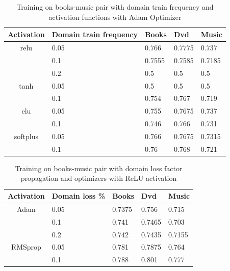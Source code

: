 \documentclass[11pt,a4paper]{article}
\begin{document}
\begin{table}[h]
\begin{center}
\begin{tabular}{|c|l|l|l|l|}
\hline
Activation & \multicolumn{1}{|p{1cm}|}{Domain train frequency}& Books & Dvd & Music \\
\hline
relu & 0.05 & 0.766 & 0.7775 & 0.737 \\
  & 0.1 & 0.7555 & 0.7585 & 0.7185 \\
  & 0.2 & 0.5 & 0.5 & 0.5 \\
\hline
tanh & 0.05 & 0.5 & 0.5 & 0.5  \\
  & 0.1 & 0.754 & 0.767 & 0.719 \\
\hline
elu & 0.05 & 0.755 & 0.7675 & 0.737 \\
  & 0.1 & 0.746 & 0.766 & 0.731 \\
\hline
softplus & 0.05 & 0.766 & 0.7675 & 0.7315 \\
  & 0.1 & 0.76 & 0.768 & 0.721 \\
\hline
\end{tabular}
\end{center}
\caption{ Training on books-music pair with domain train frequency and activation functions with Adam Optimizer}
\label{1d-activation-table}
\end{table}

\begin{table}[h]
\begin{center}
\begin{tabular}{|c|l|l|l|l|}
\hline
Activation & \multicolumn{1}{|p{1cm}|}{Domain loss \%}& Books & Dvd & Music \\
\hline
Adam & 0.05 & 0.7375 & 0.756 & 0.715 \\
 & 0.1 & 0.741 & 0.7465 & 0.703 \\
 & 0.2 & 0.742 & 0.7435 & 0.7155 \\
\hline
RMSprop & 0.05 & 0.781 & 0.7875 & 0.764 \\
 & 0.1 & 0.788 & 0.801 & 0.777 \\
\hline
\end{tabular}
\end{center}
\caption{ Training on books-music pair with domain loss factor propagation and optimizers with ReLU activation}
\label{alpha-optimizer-table}
\end{table}
\end{document}
